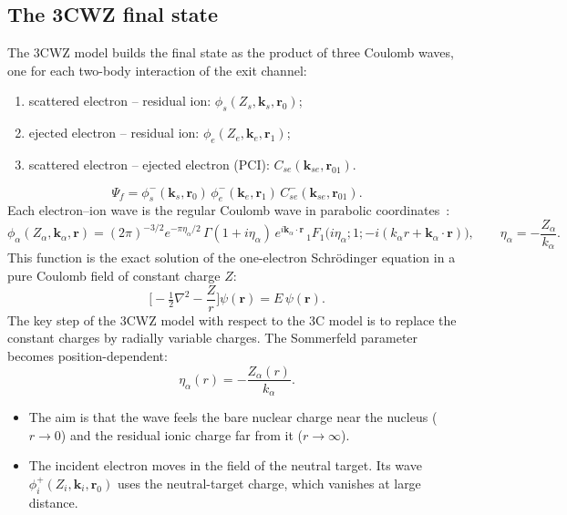 \documentclass[11pt,a4paper]{article}
\newcommand{\bk}{\mathbf k}
\newcommand{\br}{\mathbf r}
\begin{document}
\subsection{The 3CWZ final state}
The 3CWZ model builds the final state as the product of three Coulomb waves, one for each
two-body interaction of the exit channel:
\begin{enumerate}
\item scattered electron -- residual ion: $\phi_s(Z_s,\bk_s,\br_0)$;
\item ejected electron -- residual ion: $\phi_e(Z_e,\bk_e,\br_1)$;
\item scattered electron -- ejected electron (PCI): $C_{se}(\bk_{se},\br_{01})$.
\end{enumerate}
\begin{equation}
\Psi_f=\phi^-_s(\bk_s,\br_0)\,\phi^-_e(\bk_e,\br_1)\,C^-_{se}(\bk_{se},\br_{01}).
\end{equation}
Each electron--ion wave is the regular Coulomb wave in parabolic
coordinates~\cite{Landau1981,Abramowitz1972}:
\begin{equation}
\phi_\alpha(Z_\alpha,\bk_\alpha,\br)=(2\pi)^{-3/2}e^{-\pi\eta_\alpha/2}\,\Gamma(1+i\eta_\alpha)\,
e^{i\bk_\alpha\cdot\br}\,{}_1F_1\!\big(i\eta_\alpha;1;-i(k_\alpha r+\bk_\alpha\cdot\br)\big),
\qquad \eta_\alpha=-\frac{Z_\alpha}{k_\alpha}.
\label{eq:cw}
\end{equation}
This function is the exact solution of the one-electron Schr\"odinger equation in a pure Coulomb
field of constant charge $Z$:
\begin{equation}
\Big[-\tfrac12\nabla^2-\frac{Z}{r}\Big]\psi(\br)=E\,\psi(\br).
\label{eq:schr}
\end{equation}
The key step of the 3CWZ model with respect to the 3C model is to replace the constant charges by
radially variable charges. The Sommerfeld parameter becomes position-dependent:
\begin{equation}
\eta_\alpha(r)=-\frac{Z_\alpha(r)}{k_\alpha}.
\label{eq:etar}
\end{equation}
\begin{itemize}
\item The aim is that the wave feels the bare nuclear charge near the nucleus ($r\to0$) and the
  residual ionic charge far from it ($r\to\infty$).
\item The incident electron moves in the field of the neutral target. Its wave
  $\phi^+_i(Z_i,\bk_i,\br_0)$ uses the neutral-target charge, which vanishes at large distance.
\end{itemize}
\end{document}
